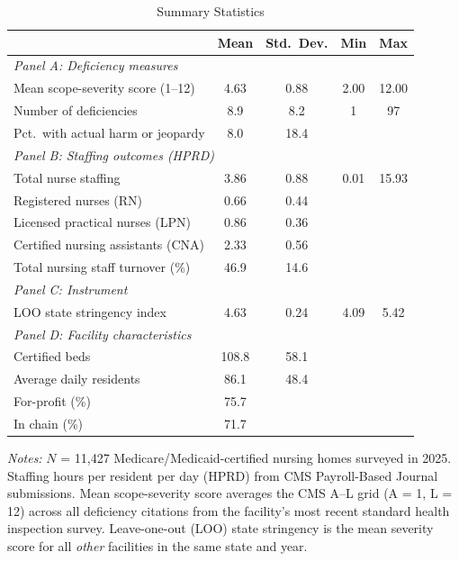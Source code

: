 \begin{table}[H]
\centering
\caption{Summary Statistics}
\label{tab:summary}
\begin{threeparttable}
\begin{tabular}{lcccc}
\toprule
& Mean & Std.~Dev. & Min & Max \\
\midrule
\multicolumn{5}{l}{\textit{Panel A: Deficiency measures}} \\[3pt]
Mean scope-severity score (1--12) & 4.63 & 0.88 & 2.00 & 12.00 \\
Number of deficiencies & 8.9 & 8.2 & 1 & 97 \\
Pct.~with actual harm or jeopardy & 8.0 & 18.4 & & \\[6pt]
\multicolumn{5}{l}{\textit{Panel B: Staffing outcomes (HPRD)}} \\[3pt]
Total nurse staffing & 3.86 & 0.88 & 0.01 & 15.93 \\
Registered nurses (RN) & 0.66 & 0.44 & & \\
Licensed practical nurses (LPN) & 0.86 & 0.36 & & \\
Certified nursing assistants (CNA) & 2.33 & 0.56 & & \\
Total nursing staff turnover (\%) & 46.9 & 14.6 & & \\[6pt]
\multicolumn{5}{l}{\textit{Panel C: Instrument}} \\[3pt]
LOO state stringency index & 4.63 & 0.24 & 4.09 & 5.42 \\[6pt]
\multicolumn{5}{l}{\textit{Panel D: Facility characteristics}} \\[3pt]
Certified beds & 108.8 & 58.1 & & \\
Average daily residents & 86.1 & 48.4 & & \\
For-profit (\%) & 75.7 & & & \\
In chain (\%) & 71.7 & & & \\
\bottomrule
\end{tabular}
\begin{tablenotes}[flushleft]
\small
\item \textit{Notes:} $N$ = 11,427 Medicare/Medicaid-certified nursing homes surveyed in 2025.
Staffing hours per resident per day (HPRD) from CMS Payroll-Based Journal submissions.
Mean scope-severity score averages the CMS A--L grid (A = 1, L = 12) across all deficiency
citations from the facility's most recent standard health inspection survey.
Leave-one-out (LOO) state stringency is the mean severity score for all \textit{other}
facilities in the same state and year.
\end{tablenotes}
\end{threeparttable}
\end{table}
